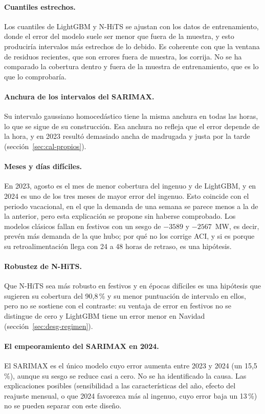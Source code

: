 \paragraph{Cuantiles estrechos.} Los cuantiles de LightGBM y N-HiTS se ajustan
con los datos de entrenamiento, donde el error del modelo suele ser menor que
fuera de la muestra, y esto produciría intervalos más estrechos de lo debido. Es
coherente con que la ventana de residuos recientes, que son errores fuera de
muestra, los corrija. No se ha comparado la cobertura dentro y fuera de la
muestra de entrenamiento, que es lo que lo comprobaría.

\paragraph{Anchura de los intervalos del SARIMAX.} Su intervalo gaussiano
homocedástico tiene la misma anchura en todas las horas, lo que se sigue de su
construcción. Esa anchura no refleja que el error depende de la hora, y en
2023 resultó demasiado ancha de madrugada y justa por la tarde
(sección~\ref{sec:cal-propios}).

\paragraph{Meses y días difíciles.} En 2023, agosto es el mes de menor cobertura del
ingenuo y de LightGBM, y en 2024 es uno de los tres meses de mayor error del
ingenuo. Esto coincide
con el periodo vacacional, en el que la demanda de una semana se parece menos a
la de la anterior, pero esta explicación se propone sin haberse comprobado. Los
modelos clásicos fallan en festivos con un sesgo de $-3589$ y $-2567$~MW, es
decir, prevén más demanda de la que hubo; por qué no los corrige ACI, y si es porque su
retroalimentación llega con 24 a 48 horas de retraso, es una hipótesis.

\paragraph{Robustez de N-HiTS.} Que N-HiTS sea más robusto en festivos y en
épocas difíciles es una hipótesis que sugieren su cobertura del 90,8\,\% y su
menor puntuación de intervalo en ellos, pero no se sostiene con el contraste:
su ventaja de error en festivos no se distingue de cero y LightGBM tiene un
error menor en Navidad (sección~\ref{sec:desg-regimen}).

\paragraph{El empeoramiento del SARIMAX en 2024.} El SARIMAX es el único modelo
cuyo error aumenta entre 2023 y 2024 (un 15,5\,\%), aunque su sesgo se reduce
casi a cero. No se ha identificado la causa. Las explicaciones posibles
(sensibilidad a las características del año, efecto del reajuste mensual, o
que 2024 favorezca más al ingenuo, cuyo error baja un 13\,\%) no se pueden
separar con este diseño.

